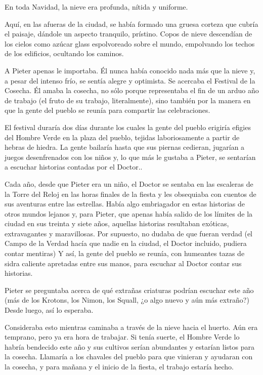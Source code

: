 En toda Navidad, la nieve era profunda, nítida y uniforme.



Aquí, en las afueras de la ciudad, se había formado una gruesa corteza que cubría el paisaje, dándole un aspecto tranquilo, prístino. Copos de nieve descendían de los cielos como azúcar glass espolvoreado sobre el mundo, empolvando los techos de los edificios, ocultando los caminos.



A Pieter apenas le importaba. Él nunca había conocido nada más que la nieve y, a pesar del intenso frío, se sentía alegre y optimista. Se acercaba el Festival de la Cosecha. Él amaba la cosecha, no sólo porque representaba el fin de un arduo año de trabajo (el fruto de su trabajo, literalmente), sino también por la manera en que la gente del pueblo se reunía para compartir las celebraciones.



El festival duraría dos días durante los cuales la gente del pueblo erigiría efigies del Hombre Verde en la plaza del pueblo, tejidas laboriosamente a partir de hebras de hiedra. La gente bailaría hasta que sus piernas cedieran, jugarían a juegos desenfrenados con los niños y, lo que más le gustaba a Pieter, se sentarían a escuchar historias contadas por el Doctor..



Cada año, desde que Pieter era un niño, el Doctor se sentaba en las escaleras de la Torre del Reloj en las horas finales de la fiesta y les obsequiaba con cuentos de sus aventuras entre las estrellas. Había algo embriagador en estas historias de otros mundos lejanos y, para Pieter, que apenas había salido de los límites de la ciudad en sus treinta y siete años, aquellas historias resultaban exóticas, extravagantes y maravillosas. Por supuesto, no dudaba de que fueran verdad (el Campo de la Verdad hacía que nadie en la ciudad, el Doctor incluido, pudiera contar mentiras) Y así, la gente del pueblo se reunía, con humeantes tazas de sidra caliente apretadas entre sus manos, para escuchar al Doctor contar sus historias.



Pieter se preguntaba acerca de qué extrañas criaturas podrían escuchar este año (más de los Krotons, los Nimon, los Squall, ¿o algo nuevo y aún más extraño?) Desde luego, así lo esperaba.



Consideraba esto mientras caminaba a través de la nieve hacia el huerto. Aún era temprano, pero ya era hora de trabajar. Si tenía suerte, el Hombre Verde lo habría bendecido este año y sus cultivos serían abundantes y estarían listos para la cosecha. Llamaría a los chavales del pueblo para que vinieran y ayudaran con la cosecha, y para mañana y el inicio de la fiesta, el trabajo estaría hecho.



